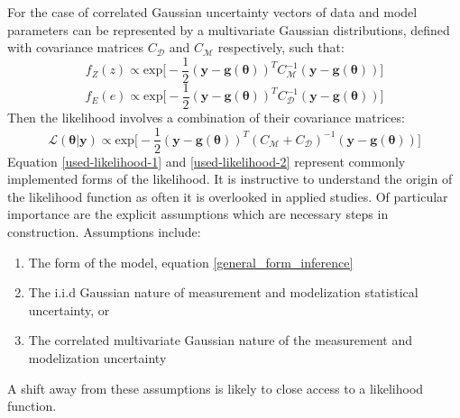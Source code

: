 For the case of correlated Gaussian uncertainty vectors of data and model parameters can be represented by a multivariate Gaussian distributions, defined with covariance matrices $C_{\mathcal{D}}$ and $C_{\mathcal{M}}$ respectively, such that:
\begin{equation}
f_Z(z) \propto \text{exp}\bigg[-\frac{1}{2}(\bm{y}-\bm{g}(\bm{\theta}))^TC_{\mathcal{M}}^{-1}(\bm{y}-\bm{g}(\bm{\theta}))\bigg]
\end{equation}
\begin{equation}
f_E(e) \propto \text{exp}\bigg[-\frac{1}{2}(\bm{y}-\bm{g}(\bm{\theta}))^TC_{\mathcal{D}}^{-1}(\bm{y}-\bm{g}(\bm{\theta}))\bigg]
\end{equation}
Then the likelihood involves a combination of their covariance matrices:
\begin{equation}
\mathcal{L}(\bm{\theta}|\bm{y}) \propto \text{exp}\bigg[-\frac{1}{2}(\bm{y}-\bm{g}(\bm{\theta}))^T(C_{\mathcal{M}}+C_{\mathcal{D}})^{-1}(\bm{y}-\bm{g}(\bm{\theta}))\bigg]
\label{used-likelihood-2}
\end{equation}
Equation \ref{used-likelihood-1} and \ref{used-likelihood-2} represent commonly implemented forms of the likelihood. It is instructive to understand the origin of the likelihood function as often it is overlooked in applied studies. Of particular importance are the explicit assumptions which are necessary steps in construction. Assumptions include:
\begin{enumerate}
\item The form of the model, equation \ref{general_form_inference}
\item The i.i.d Gaussian nature of measurement and modelization statistical uncertainty, or
\item The correlated multivariate Gaussian nature of the measurement and modelization uncertainty
\end{enumerate}
A shift away from these assumptions is likely to close access to a likelihood function.


